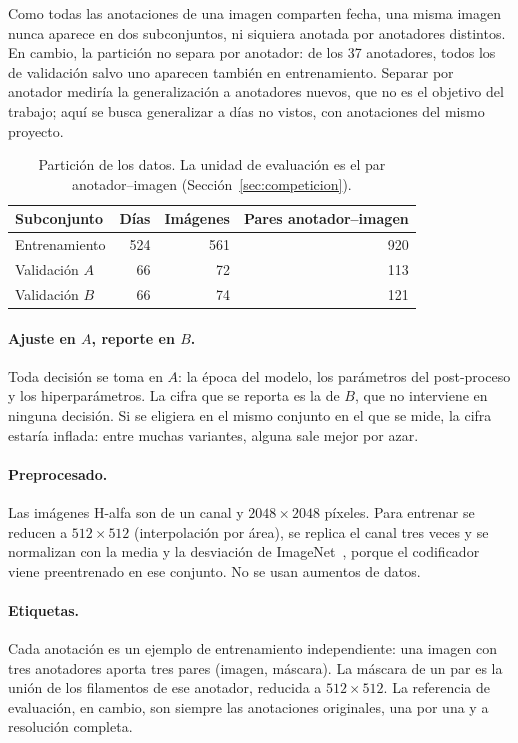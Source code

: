 Como todas las anotaciones de una imagen comparten fecha, una misma
imagen nunca aparece en dos subconjuntos, ni siquiera anotada por
anotadores distintos. En cambio, la partición no separa por anotador: de
los 37 anotadores, todos los de validación salvo uno aparecen también en
entrenamiento. Separar por anotador mediría la generalización a
anotadores nuevos, que no es el objetivo del trabajo; aquí se busca
generalizar a días no vistos, con anotaciones del mismo proyecto.

\begin{table}[ht]
\centering
\begin{tabular}{@{}lrrr@{}}
\toprule
Subconjunto & Días & Imágenes & Pares anotador--imagen\\
\midrule
Entrenamiento & 524 & 561 & 920\\
Validación $A$ & 66 & 72 & 113\\
Validación $B$ & 66 & 74 & 121\\
\bottomrule
\end{tabular}
\caption{Partición de los datos. La unidad de evaluación es el par
anotador--imagen (Sección~\ref{sec:competicion}).}
\label{tab:split}
\end{table}

\paragraph{Ajuste en $A$, reporte en $B$.} Toda decisión se toma en
$A$: la época del modelo, los parámetros del post-proceso y los
hiperparámetros. La cifra que se reporta es la de $B$, que no interviene
en ninguna decisión. Si se eligiera en el mismo conjunto en el que se
mide, la cifra estaría inflada: entre muchas variantes, alguna sale
mejor por azar.

\paragraph{Preprocesado.} Las imágenes H-alfa son de un canal y
$2048\times2048$ píxeles. Para entrenar se reducen a $512\times512$
(interpolación por área), se replica el canal tres veces y se
normalizan con la media y la desviación de ImageNet~\cite{deng2009},
porque el codificador viene preentrenado en ese conjunto. No se usan
aumentos de datos.

\paragraph{Etiquetas.} Cada anotación es un ejemplo de entrenamiento
independiente: una imagen con tres anotadores aporta tres pares
(imagen, máscara). La máscara de un par es la unión de los filamentos de
ese anotador, reducida a $512\times512$. La referencia de evaluación,
en cambio, son siempre las anotaciones originales, una por una y a
resolución completa.

